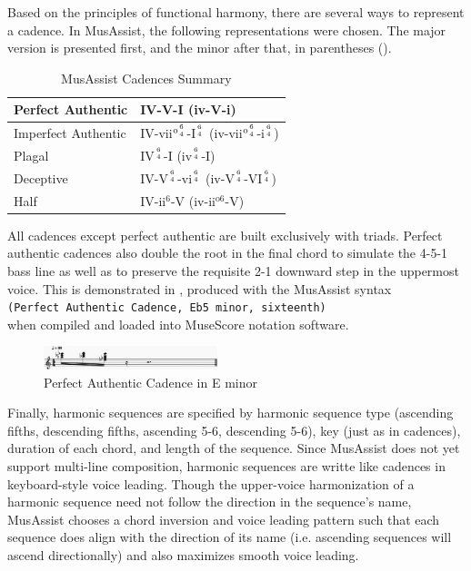 \documentclass{article}
\begin{document}
Based on the principles of functional harmony, there are several ways to represent a cadence. 
In MusAssist, the following representations were chosen. The major version is presented first, 
and the minor after that, in parentheses ().

\begin{table}[h]
  \begin{center}
    \renewcommand{\arraystretch}{1.5}
\begin{tabular}{|l|l|}
\hline
Perfect Authentic & IV-V-I (iv-V-i) \\ \hline
Imperfect Authentic & IV-vii$^{\text{o}{6 \atop 4}}$-I$^{6 \atop 4}$ (iv-vii$^{\text{o}{6 \atop 4}}$-i$^{6 \atop 4}$) \\ \hline
Plagal & IV$^{6 \atop 4}$-I (iv$^{6 \atop 4}$-I) \\ \hline
Deceptive & IV-V$^{6 \atop 4}$-vi$^{6 \atop 4}$ (iv-V$^{6 \atop 4}$-VI$^{6 \atop 4}$) \\ \hline
Half & IV-ii$^6$-V (iv-ii$^{\text{o}6}$-V) \\ \hline
\end{tabular}
\caption{MusAssist Cadences Summary}\label{table:cadences}
\end{center}
\vspace{-7mm}
\end{table}

All cadences except perfect authentic are built exclusively with triads.
Perfect authentic cadences also double the root in the final chord to simulate the 4-5-1 bass line
as well as to preserve the requisite 2-1 downward step in the uppermost voice. 
This is demonstrated in , produced with the MusAssist syntax \\
\noindent\verb.(Perfect Authentic Cadence, Eb5 minor, sixteenth). \\
when compiled and loaded into MuseScore notation software.
\begin{figure}[h!]
\centering
\includegraphics[width=0.45\textwidth]{images/perfauth}
  \caption{Perfect Authentic Cadence in E\musFlat\; minor \label{fig:perfauth}}
\end{figure}

Finally, harmonic sequences are specified by harmonic sequence type (ascending fifths,
descending fifths, ascending 5-6, descending 5-6), key (just as in cadences), duration of each chord,
and length of the sequence. Since MusAssist does not yet support multi-line composition, harmonic sequences are 
writte like cadences in keyboard-style voice leading. Though the
upper-voice harmonization of a harmonic sequence need not follow the direction in the sequence’s
name, MusAssist chooses a chord inversion and voice leading pattern such that each sequence does
align with the direction of its name (i.e. ascending sequences will ascend directionally) 
and also maximizes smooth voice leading.
\end{document}

